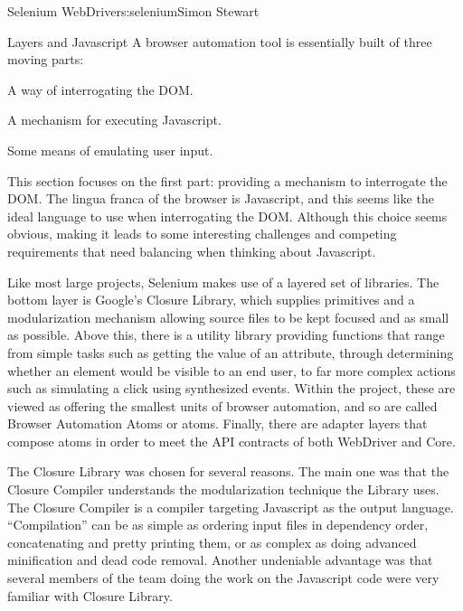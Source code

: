\begin{aosachapter}{Selenium WebDriver}{s:selenium}{Simon Stewart}
\begin{aosasect1}{Layers and Javascript}
A browser automation tool is essentially built of three moving parts:

\begin{aosaitemize}

\item A way of interrogating the DOM.

\item A mechanism for executing Javascript.

\item Some means of emulating user input.

\end{aosaitemize}

This section focuses on the first part: providing a mechanism to
interrogate the DOM\@. The lingua franca of the browser is Javascript,
and this seems like the ideal language to use when interrogating the
DOM\@. Although this choice seems obvious, making it leads to some
interesting challenges and competing requirements that need balancing
when thinking about Javascript.

Like most large projects, Selenium makes use of a layered set of
libraries.  The bottom layer is Google's Closure Library, which
supplies primitives and a modularization mechanism allowing source
files to be kept focused and as small as possible. Above this, there
is a utility library providing functions that range from simple tasks
such as getting the value of an attribute, through determining whether
an element would be visible to an end user, to far more complex
actions such as simulating a click using synthesized events. Within
the project, these are viewed as offering the smallest units of
browser automation, and so are called Browser Automation Atoms or
atoms. Finally, there are adapter layers that compose atoms in order
to meet the API contracts of both WebDriver and Core.


The Closure Library was chosen for several reasons. The main one was
that the Closure Compiler understands the modularization technique the
Library uses. The Closure Compiler is a compiler targeting Javascript
as the output language. ``Compilation'' can be as simple as ordering
input files in dependency order, concatenating and pretty printing
them, or as complex as doing advanced minification and dead code
removal. Another undeniable advantage was that several members of the
team doing the work on the Javascript code were very familiar with
Closure Library.


\end{aosasect1}
\end{aosachapter}
